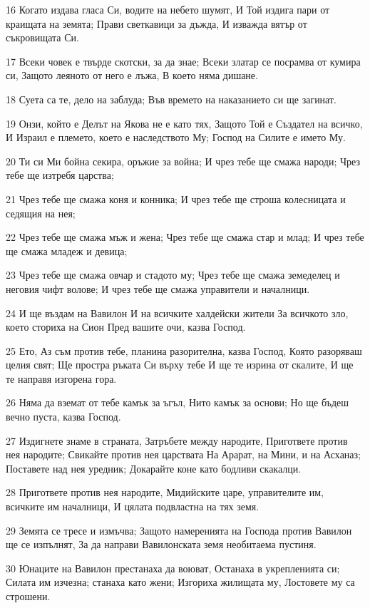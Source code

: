 \par 16 Когато издава гласа Си, водите на небето шумят, И Той издига пари от краищата на земята; Прави светкавици за дъжда, И изважда вятър от съкровищата Си.
\par 17 Всеки човек е твърде скотски, за да знае; Всеки златар се посрамва от кумира си, Защото леяното от него е лъжа, В което няма дишане.
\par 18 Суета са те, дело на заблуда; Във времето на наказанието си ще загинат.
\par 19 Онзи, който е Делът на Якова не е като тях, Защото Той е Създател на всичко, И Израил е племето, което е наследството Му; Господ на Силите е името Му.
\par 20 Ти си Ми бойна секира, оръжие за война; И чрез тебе ще смажа народи; Чрез тебе ще изтребя царства;
\par 21 Чрез тебе ще смажа коня и конника; И чрез тебе ще строша колесницата и седящия на нея;
\par 22 Чрез тебе ще смажа мъж и жена; Чрез тебе ще смажа стар и млад; И чрез тебе ще смажа младеж и девица;
\par 23 Чрез тебе ще смажа овчар и стадото му; Чрез тебе ще смажа земеделец и неговия чифт волове; И чрез тебе ще смажа управители и началници.
\par 24 И ще въздам на Вавилон И на всичките халдейски жители За всичкото зло, което сториха на Сион Пред вашите очи, казва Господ.
\par 25 Ето, Аз съм против тебе, планина разорителна, казва Господ, Която разоряваш целия свят; Ще простра ръката Си върху тебе И ще те изрина от скалите, И ще те направя изгорена гора.
\par 26 Няма да вземат от тебе камък за ъгъл, Нито камък за основи; Но ще бъдеш вечно пуста, казва Господ.
\par 27 Издигнете знаме в страната, Затръбете между народите, Пригответе против нея народите; Свикайте против нея царствата На Арарат, на Мини, и на Асханаз; Поставете над нея уредник; Докарайте коне като бодливи скакалци.
\par 28 Пригответе против нея народите, Мидийските царе, управителите им, всичките им началници, И цялата подвластна на тях земя.
\par 29 Земята се тресе и измъчва; Защото намеренията на Господа против Вавилон ще се изпълнят, За да направи Вавилонската земя необитаема пустиня.
\par 30 Юнаците на Вавилон престанаха да воюват, Останаха в укрепленията си; Силата им изчезна; станаха като жени; Изгориха жилищата му, Лостовете му са строшени.
